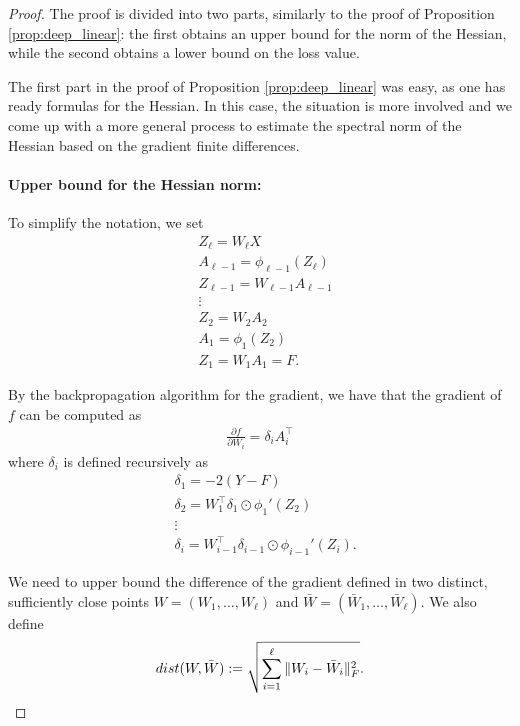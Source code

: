 \documentclass[10pt,a4paper]{amsart}
\begin{document}
\begin{proof}
The proof is divided into two parts, similarly to the proof of Proposition \ref{prop:deep_linear}: the first obtains an upper bound for the norm of the Hessian, while the second obtains a lower bound on the loss value.

The first part in the proof of Proposition \ref{prop:deep_linear} was easy, as one has ready formulas for the Hessian. In this case, the situation is more involved and we come up with a more general process to estimate the spectral norm of the Hessian based on the gradient finite differences.

\paragraph{Upper bound for the Hessian norm:}
To simplify the notation, we set
    \begin{align*}
        &Z_{\ell} = W_{\ell} X \\
        &A_{\ell-1} = \phi_{\ell-1} (Z_{\ell}) \\
        & Z_{\ell-1} = W_{\ell-1} A_{\ell-1} \\
        &\vdots 
        \\
        & Z_2 = W_2 A_2 \\ &
        A_1 = \phi_1(Z_2) \\ &
        Z_1 = W_1 A_1 = F.
    \end{align*}
    
    By the backpropagation algorithm for the gradient, we have that the gradient of $f$ can be computed as
    \begin{align*}
        \frac{\partial f}{\partial W_i} = \delta_i A_i^\top
    \end{align*}
    where $\delta_i$ is defined recursively as
    \begin{align*}
        &\delta_1 = -2(Y-F) \\ &
        \delta_2 = W_1^\top \delta_1 \odot \phi_1'(Z_2) \\ &
        \vdots \\ &
        \delta_i = W_{i-1}^\top \delta_{i-1} \odot \phi_{i-1}'(Z_i).
    \end{align*}

We need to upper bound the difference of the gradient defined in two distinct, sufficiently close points $W=(W_1,\dots,W_{\ell})$ and $\bar W = (\bar W_1,\dots, \bar W_{\ell})$. We also define
\begin{equation*}
    \textnormal{dist}(W, \bar W) := \sqrt{\sum_{i=1}^{\ell} \|W_i- \bar W_i\|^2_{\rm F}}.
\end{equation*}


\end{proof}
\end{document}
